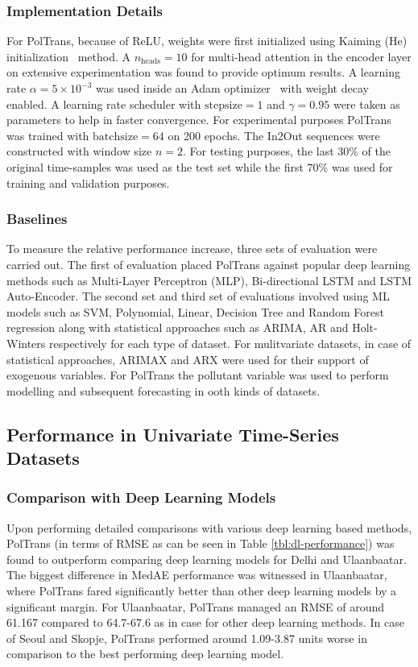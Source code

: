 \documentclass[10pt,journal]{IEEEtran}
\begin{document}
\subsubsection{Implementation Details}
For {PolTrans}, because of ReLU, weights were first initialized using Kaiming (He) initialization~\cite{He.2015} method. A ${n_{\text{heads}} = 10}$ for multi-head attention in the encoder layer on extensive experimentation was found to provide optimum  results. A learning rate ${\alpha = 5 \times 10^{-3}}$ was used inside an Adam optimizer~\cite{Kingma.2014} with weight decay enabled. A learning rate scheduler with ${\mathrm{stepsize} = 1}$ and ${\gamma = 0.95}$ were taken as parameters to help in faster convergence. For experimental purposes {PolTrans}  was trained with ${\mathrm{batchsize} = 64}$ on 200 epochs. The In2Out sequences were constructed with window size ${n = 2}$. For testing purposes,  the last 30\% of the original time-samples was used as the test set while the first 70\% was used for training and validation purposes.

\subsubsection{Baselines} 
To measure the relative performance increase, three sets of evaluation were carried out. The first of evaluation placed {PolTrans}  against popular deep learning methods such as Multi-Layer Perceptron (MLP), Bi-directional LSTM and LSTM Auto-Encoder. The second set and third set of evaluations involved using ML models such as SVM, Polynomial, Linear, Decision Tree and Random Forest regression along with statistical approaches such as ARIMA, AR and Holt-Winters respectively for each type of dataset.
For mulitvariate datasets, in case of statistical approaches, ARIMAX and ARX were used for their support of exogenous variables. For {PolTrans}  the pollutant variable was used to perform modelling and subsequent forecasting in ooth kinds of datasets.

\subsection{Performance in Univariate Time-Series Datasets}

\subsubsection{Comparison with Deep Learning Models}

Upon performing detailed comparisons with various deep learning based methods, {PolTrans} (in terms of RMSE as can be seen in Table \ref{tbl:dl-performance}) was found to outperform comparing deep learning models for Delhi and Ulaanbaatar. The biggest difference in MedAE performance was witnessed in Ulaanbaatar, where {PolTrans}  fared significantly better than other deep learning models by a significant margin. For Ulaanbaatar, {PolTrans}  managed an RMSE of around 61.167 compared to 64.7-67.6 as in  case for other deep learning methods. In case of Seoul and Skopje,  {PolTrans}  performed around 1.09-3.87 units worse in comparison to the best performing deep learning model. 
\end{document}
